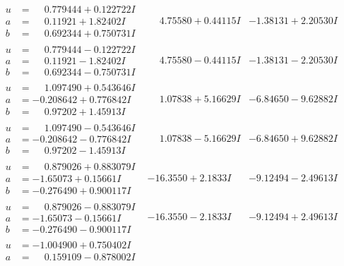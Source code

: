 \documentclass[1p]{elsarticle_modified}
\theoremstyle{definition}
\begin{document}
$$\begin{array}{c|c|c}
\begin{aligned}
u &= \phantom{-}0.779444 + 0.122722 I \\
a &= \phantom{-}0.11921 + 1.82402 I \\
b &= \phantom{-}0.692344 + 0.750731 I\end{aligned}
 & \phantom{-}4.75580 + 0.44115 I & -1.38131 + 2.20530 I \\ \hline\begin{aligned}
u &= \phantom{-}0.779444 - 0.122722 I \\
a &= \phantom{-}0.11921 - 1.82402 I \\
b &= \phantom{-}0.692344 - 0.750731 I\end{aligned}
 & \phantom{-}4.75580 - 0.44115 I & -1.38131 - 2.20530 I \\ \hline\begin{aligned}
u &= \phantom{-}1.097490 + 0.543646 I \\
a &= -0.208642 + 0.776842 I \\
b &= \phantom{-}0.97202 + 1.45913 I\end{aligned}
 & \phantom{-}1.07838 + 5.16629 I & -6.84650 - 9.62882 I \\ \hline\begin{aligned}
u &= \phantom{-}1.097490 - 0.543646 I \\
a &= -0.208642 - 0.776842 I \\
b &= \phantom{-}0.97202 - 1.45913 I\end{aligned}
 & \phantom{-}1.07838 - 5.16629 I & -6.84650 + 9.62882 I \\ \hline\begin{aligned}
u &= \phantom{-}0.879026 + 0.883079 I \\
a &= -1.65073 + 0.15661 I \\
b &= -0.276490 + 0.900117 I\end{aligned}
 & -16.3550 + 2.1833 I & -9.12494 - 2.49613 I \\ \hline\begin{aligned}
u &= \phantom{-}0.879026 - 0.883079 I \\
a &= -1.65073 - 0.15661 I \\
b &= -0.276490 - 0.900117 I\end{aligned}
 & -16.3550 - 2.1833 I & -9.12494 + 2.49613 I \\ \hline\begin{aligned}
u &= -1.004900 + 0.750402 I \\
a &= \phantom{-}0.159109 - 0.878002 I \\

\end{aligned}
\end{array}$$
\end{document}
